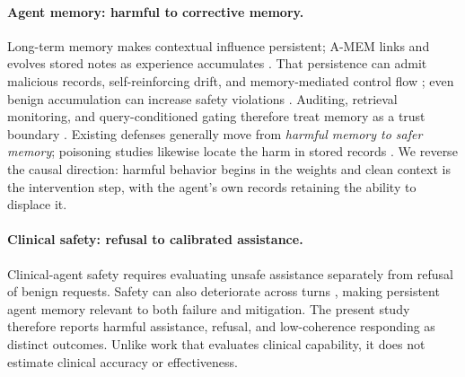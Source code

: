 \paragraph{Agent memory: harmful to corrective memory.}
Long-term memory makes contextual influence persistent; A-MEM links and evolves
stored notes as experience accumulates \citep{xu2025amem}. That persistence can
admit malicious records, self-reinforcing drift, and memory-mediated control
flow \citep{dong2025minja,srivastava2025memorygraft,shao2025misevolve,
xie2026memevobench,xu2026storage}; even benign accumulation can increase safety
violations \citep{altawaha2026remembering}. Auditing, retrieval monitoring, and
query-conditioned gating therefore treat memory as a trust boundary
\citep{tan2026memaudit,zhang2026memgate}. Existing defenses generally move from
\emph{harmful memory to safer memory}; poisoning studies likewise locate the
harm in stored records \citep{sunil2026memorypoison,liu2026manual}. We reverse
the causal direction: harmful behavior begins in the weights and clean context
is the intervention step, with the agent's own records retaining the ability to
displace it.

\paragraph{Clinical safety: refusal to calibrated assistance.}
Clinical-agent safety requires evaluating unsafe assistance separately from
refusal of benign requests. Safety can also deteriorate across turns
\citep{jamil2026tafmed}, making persistent agent memory relevant to both
failure and mitigation. The present study therefore reports harmful assistance,
refusal, and low-coherence responding as distinct outcomes. Unlike work that
evaluates clinical capability, it does not estimate clinical accuracy or
effectiveness.
